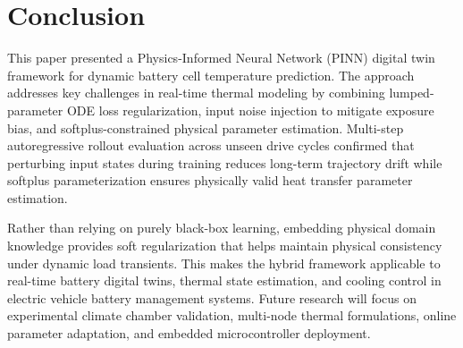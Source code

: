 \section{Conclusion}

This paper presented a Physics-Informed Neural Network (PINN) digital twin framework for dynamic battery cell temperature prediction. The approach addresses key challenges in real-time thermal modeling by combining lumped-parameter ODE loss regularization, input noise injection to mitigate exposure bias, and softplus-constrained physical parameter estimation. Multi-step autoregressive rollout evaluation across unseen drive cycles confirmed that perturbing input states during training reduces long-term trajectory drift while softplus parameterization ensures physically valid heat transfer parameter estimation.

Rather than relying on purely black-box learning, embedding physical domain knowledge provides soft regularization that helps maintain physical consistency under dynamic load transients. This makes the hybrid framework applicable to real-time battery digital twins, thermal state estimation, and cooling control in electric vehicle battery management systems. Future research will focus on experimental climate chamber validation, multi-node thermal formulations, online parameter adaptation, and embedded microcontroller deployment.

